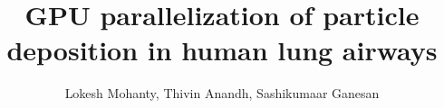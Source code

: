 \title{GPU parallelization of particle deposition in human lung airways}
\author{Lokesh Mohanty, Thivin Anandh, Sashikumaar Ganesan}

